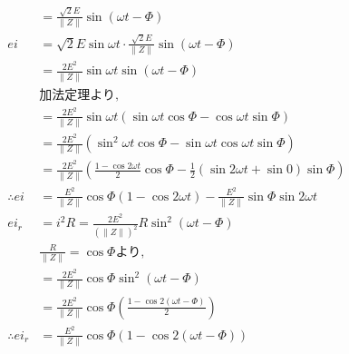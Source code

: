 \documentclass[twocolumn]{article}
\begin{document}
\begin{enumerate}
\begin{align*}
                          & = \frac{\sqrt{2}E}{\|Z\|}\sin \left(\omega t - \Phi\right)                                                                               \\
          ei              & = \sqrt{2}E\sin\omega t \cdot \frac{\sqrt{2}E}{\|Z\|}\sin \left(\omega t - \Phi\right)                                                   \\
                          & = \frac{2E^2}{\|Z\|}\sin\omega t  \sin \left(\omega t - \Phi\right)                                                                      \\
                          & \text{加法定理より,}                                                                                                                           \\
                          & = \frac{2E^2}{\|Z\|}\sin\omega t \left( \sin \omega t \cos \Phi - \cos \omega t \sin \Phi \right)                                        \\
                          & = \frac{2E^2}{\|Z\|} \left( \sin^2\omega t \cos \Phi - \sin \omega t \cos \omega t \sin \Phi \right)                                     \\
                          & = \frac{2E^2}{\|Z\|} \left( \frac{1 - \cos 2 \omega t}{2} \cos \Phi - \frac{1}{2} \left( \sin2\omega t  + \sin 0\right)\sin \Phi \right) \\
          \therefore ei   & = \frac{E^2}{\|Z\|} \cos \Phi \left(1-\cos2\omega t\right) - \frac{E^2}{\|Z\|} \sin\Phi \sin 2 \omega t                                  \\
          ei_r            & = i^2 R = \frac{2E^2}{(\|Z\|)^2}R\sin^2\left(\omega t -\Phi\right)                                                                       \\
                          & \frac{R}{\|Z\|} = \cos \Phi\text{より,}                                                                                                    \\
                          & = \frac{2E^2}{\|Z\|} \cos \Phi \sin^2\left(\omega t - \Phi\right)                                                                        \\
                          & = \frac{2E^2}{\|Z\|} \cos \Phi \left( \frac{1 - \cos 2 \left(\omega t - \Phi\right)}{2} \right)                                          \\
          \therefore ei_r & = \frac{E^2}{\|Z\|} \cos \Phi \left( 1 - \cos 2 \left(\omega t - \Phi\right)\right)                                                      \\

\end{align*}
\end{enumerate}
\end{document}
